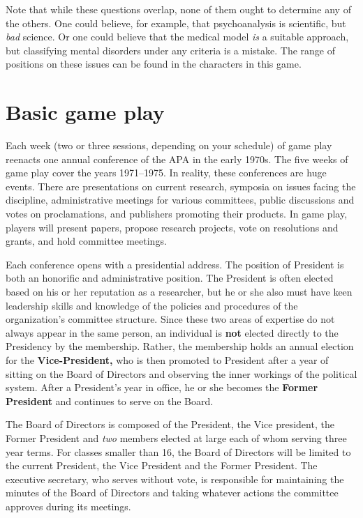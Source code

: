 \begin{refsection}
Note that while these questions overlap, none of them ought to determine any of the others. One could believe, for example, that psychoanalysis is scientific, but \emph{bad} science. Or one could believe that the medical model \emph{is} a suitable approach, but classifying mental disorders under any criteria is a mistake. The range of positions on these issues can be found in the characters in this game.

\section{Basic game play}
\label{basicgameplay}

Each week (two or three sessions, depending on your schedule) of game play reenacts one annual conference of the APA in the early 1970s. The five weeks of game play cover the years 1971--1975. In reality, these conferences are huge events. There are presentations on current research, symposia on issues facing the discipline, administrative meetings for various committees, public discussions and votes on proclamations, and publishers promoting their products. In game play, players will present papers, propose research projects, vote on resolutions and grants, and hold committee meetings.

Each conference opens with a presidential address. The position of President is both an honorific and administrative position. The President is often elected based on his or her reputation as a researcher, but he or she also must have keen leadership skills and knowledge of the policies and procedures of the organization's committee structure. Since these two areas of expertise do not always appear in the same person, an individual is \textbf{not} elected directly to the Presidency by the membership. Rather, the membership holds an annual election for the \textbf{Vice-President,} who is then promoted to President after a year of sitting on the Board of Directors and observing the inner workings of the political system. After a President’s year in office, he or she becomes the \textbf{Former President} and continues to serve on the Board.

The Board of Directors is composed of the President, the Vice president, the Former President and \emph{two} members elected at large each of whom serving three year terms. For classes smaller than 16, the Board of Directors will be limited to the current President, the Vice President and the Former President. The executive secretary, who serves without vote, is responsible for maintaining the minutes of the Board of Directors and taking whatever actions the committee approves during its meetings.


\end{refsection}
